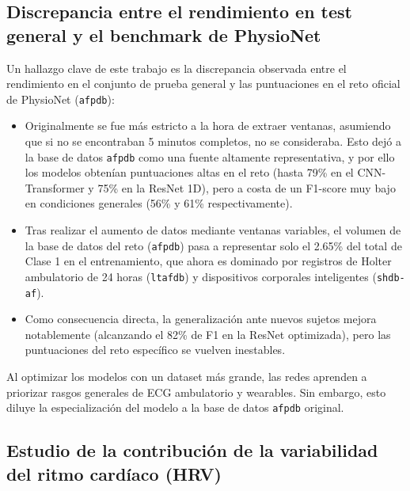 \subsection{Discrepancia entre el rendimiento en test general y el benchmark de PhysioNet}
Un hallazgo clave de este trabajo es la discrepancia observada entre el rendimiento en el
conjunto de prueba general y las puntuaciones en el reto oficial de PhysioNet (\texttt{afpdb}):
\begin{itemize}
  \item Originalmente se fue más estricto a la hora de extraer ventanas, asumiendo que si no se
  encontraban 5 minutos completos, no se consideraba. Esto dejó a la base de datos \texttt{afpdb} como una fuente
  altamente representativa, y por ello los modelos obtenían puntuaciones altas en el reto (hasta 79\% en el
  CNN-Transformer y 75\% en la ResNet 1D), pero a costa de un F1-score muy bajo en condiciones generales
  (56\% y 61\% respectivamente).
  \item Tras realizar el aumento de datos mediante ventanas variables, el volumen de la base de datos
  del reto (\texttt{afpdb}) pasa a representar solo el 2.65\% del total de Clase 1 en el entrenamiento,
  que ahora es dominado por registros de Holter ambulatorio de 24 horas (\texttt{ltafdb}) y
  dispositivos corporales inteligentes (\texttt{shdb-af}).
  \item Como consecuencia directa, la generalización ante nuevos sujetos
  mejora notablemente (alcanzando el 82\% de F1 en la ResNet optimizada),
  pero las puntuaciones del reto específico se vuelven inestables.
\end{itemize}

Al optimizar los modelos con un dataset más grande, las redes aprenden a priorizar rasgos
generales de ECG ambulatorio y wearables. Sin embargo, esto diluye la especialización del
modelo a la base de datos \texttt{afpdb} original.

\subsection{Estudio de la contribución de la variabilidad del ritmo cardíaco (HRV)}
\label{subsec:estudio_ablacion_hrv}

